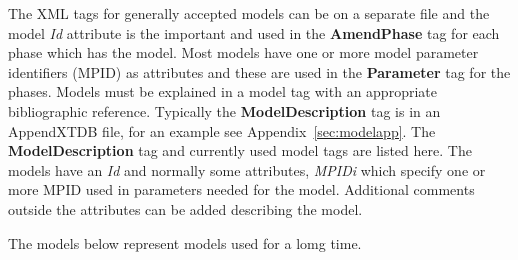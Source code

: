\documentclass{article}
\begin{document}
The XML tags for generally accepted models can be on a separate file
and the model {\em Id} attribute is the important and used in the {\bf
  AmendPhase} tag for each phase which has the model.  Most models
have one or more model parameter identifiers (MPID) as attributes and
these are used in the {\bf Parameter} tag for the phases.  Models must
be explained in a model tag with an appropriate bibliographic
reference.  Typically the {\bf ModelDescription} tag is in an
AppendXTDB file, for an example see Appendix~\ref{sec:modelapp}.  The
{\bf ModelDescription} tag and currently used model tags are listed
here.  The models have an {\em Id} and normally some attributes, {\em
  MPIDi} which specify one or more MPID used in parameters needed for
the model.  Additional comments outside the attributes can be added
describing the model.

The models below represent models used for a lomg time.
\end{document}
